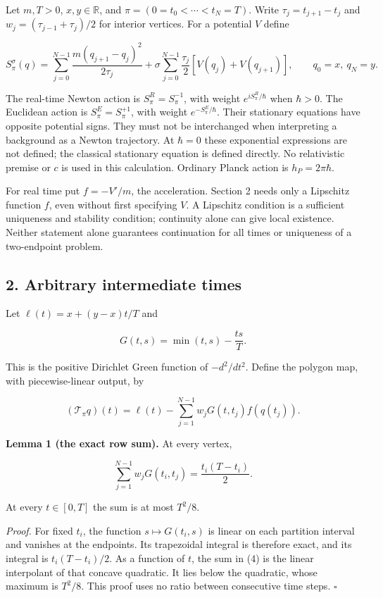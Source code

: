 \documentclass[11pt,a4paper]{article}
\begin{document}
Let \(m,T>0\), \(x,y\in\mathbb R\), and \(\pi=(0=t_0<\cdots<t_N=T)\).
Write \(\tau_j=t_{j+1}-t_j\) and \(w_j=(\tau_{j-1}+\tau_j)/2\) for
interior vertices. For a potential \(V\) define

\[
 S_\pi^\sigma(q)=\sum_{j=0}^{N-1}
 \frac{m(q_{j+1}-q_j)^2}{2\tau_j}
 +\sigma\sum_{j=0}^{N-1}\frac{\tau_j}{2}
       [V(q_j)+V(q_{j+1})],\qquad q_0=x,\ q_N=y.
 \tag{1}
\]

The real-time Newton action is \(S_\pi^R=S_\pi^{-1}\), with weight
\(e^{iS_\pi^R/\hbar}\) when \(\hbar>0\). The Euclidean action is
\(S_\pi^E=S_\pi^{+1}\), with weight \(e^{-S_\pi^E/\hbar}\). Their
stationary equations have opposite potential signs. They must not be
interchanged when interpreting a background as a Newton trajectory. At
\(\hbar=0\) these exponential expressions are not defined; the classical
stationary equation is defined directly. No relativistic premise or
\(c\) is used in this calculation. Ordinary Planck action is
\(h_P=2\pi\hbar\).

For real time put \(f=-V'/m\), the acceleration. Section 2 needs only a
Lipschitz function \(f\), even without first specifying \(V\). A
Lipschitz condition is a sufficient uniqueness and stability condition;
continuity alone can give local existence. Neither statement alone
guarantees continuation for all times or uniqueness of a two-endpoint
problem.

\subsection{2. Arbitrary intermediate
times}\label{arbitrary-intermediate-times}

Let \(\ell(t)=x+(y-x)t/T\) and

\[
 G(t,s)=\min(t,s)-\frac{ts}{T}.
 \tag{2}
\]

This is the positive Dirichlet Green function of \(-d^2/dt^2\). Define
the polygon map, with piecewise-linear output, by

\[
 (\mathcal T_\pi q)(t)=\ell(t)
       -\sum_{j=1}^{N-1}w_jG(t,t_j)f(q(t_j)).
 \tag{3}
\]

\textbf{Lemma 1 (the exact row sum).} At every vertex,

\[
 \sum_{j=1}^{N-1}w_jG(t_i,t_j)=\frac{t_i(T-t_i)}2.
 \tag{4}
\]

At every \(t\in[0,T]\) the sum is at most \(T^2/8\).

\emph{Proof.} For fixed \(t_i\), the function \(s\mapsto G(t_i,s)\) is
linear on each partition interval and vanishes at the endpoints. Its
trapezoidal integral is therefore exact, and its integral is
\(t_i(T-t_i)/2\). As a function of \(t\), the sum in (4) is the linear
interpolant of that concave quadratic. It lies below the quadratic,
whose maximum is \(T^2/8\). This proof uses no ratio between consecutive
time steps. \(\square\)
\end{document}
